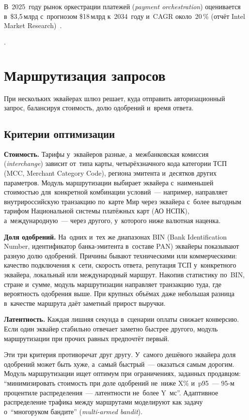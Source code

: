 В~2025~году рынок оркестрации платежей (\textit{payment orchestration}) оценивается в~\$3{,}5\,млрд с~прогнозом
\$18\,млрд к~2034~году и~CAGR около~20\,\% (отчёт Intel Market
Research)~\cite{intel-market-payment-orchestration}.

.

\section{Маршрутизация запросов}\label{sec:gw-routing}

При нескольких эквайерах шлюз решает, куда отправить авторизационный запрос,
балансируя стоимость, долю одобрений и~время ответа.

\subsection*{Критерии оптимизации}

\textbf{Стоимость.} Тарифы у~эквайеров разные, а~межбанковская комиссия (\textit{interchange}) зависит
от~типа карты, четырёхзначного кода категории ТСП (MCC, Merchant Category
Code), региона эмитента и~десятков других параметров. Модуль маршрутизации
выбирает эквайера с~наименьшей стоимостью для~конкретной комбинации
условий~--- например, направляет внутрироссийскую транзакцию по~карте Мир через
эквайера с~более выгодным тарифом Национальной системы платёжных карт (АО
НСПК), а~международную~--- через другого, у~которого ниже валютная наценка.

\textbf{Доля одобрений.} На~одних и~тех же диапазонах BIN (Bank Identification
Number, идентификатор банка-эмитента в~составе PAN) эквайеры показывают разную
долю одобрений. Причины бывают техническими или коммерческими: качество
подключения к~сети, скорость ответа, репутация ТСП у~конкретного эквайера,
локальный или международный маршрут. Накопив статистику по~BIN, стране и~сумме,
модуль маршрутизации направляет транзакцию туда, где вероятность одобрения
выше. При крупных объёмах даже небольшая разница в~качестве маршрута даёт
заметный прирост выручки.

\textbf{Латентность.} Каждая лишняя секунда в~сценарии оплаты снижает
конверсию. Если один эквайер стабильно отвечает заметно быстрее другого,
модуль маршрутизации при прочих равных предпочтёт первый.

Эти три критерия противоречат друг другу. У~самого дешёвого эквайера доля
одобрений может быть хуже, а~самый быстрый~--- оказаться самым дорогим. Модуль
маршрутизации ищет оптимум при ограничениях, заданных продавцом:
\enquote{минимизировать стоимость при доле одобрений не~ниже X\% и~p95~--- 95-м
процентиле распределения~--- латентности не~более Y~мс}. Адаптивное
распределение трафика между маршрутами моделируют как задачу
о~\enquote{многоруком бандите} (\textit{multi-armed bandit}).

